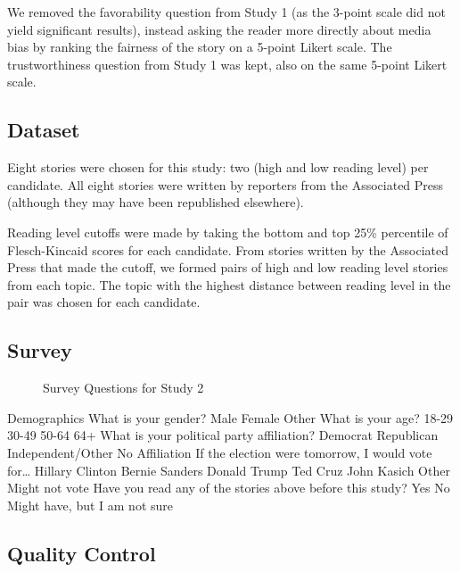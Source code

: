 We removed the favorability question from Study 1 (as the 3-point scale did not yield significant results), instead asking the reader more directly about media bias by ranking the fairness of the story on a 5-point Likert scale. The trustworthiness question from Study 1 was kept, also on the same 5-point Likert scale.


\subsection{Dataset} 
Eight stories were chosen for this study: two (high and low reading level) per candidate. All eight stories were written by reporters from the Associated Press (although they may have been republished elsewhere).

Reading level cutoffs were made by taking the bottom and top 25\% percentile of Flesch-Kincaid scores for each candidate. From stories written by the Associated Press that made the cutoff, we formed pairs of high and low reading level stories from each topic. The topic with the highest distance between reading level in the pair was chosen for each candidate.


 
 
 
\subsection{Survey}


\begin{figure}[h!] 
\centering
  \caption{Survey Questions for Study 2}
\end{figure}



Demographics
What is your gender?
 Male
 Female
 Other
What is your age?
 18-29
 30-49
 50-64
 64+
What is your political party affiliation?
 Democrat
 Republican
 Independent/Other
 No Affiliation
If the election were tomorrow, I would vote for…
 Hillary Clinton
 Bernie Sanders
 Donald Trump
 Ted Cruz
 John Kasich
 Other
 Might not vote
Have you read any of the stories above before this study?
 Yes
 No
 Might have, but I am not sure





\subsection{Quality Control}

